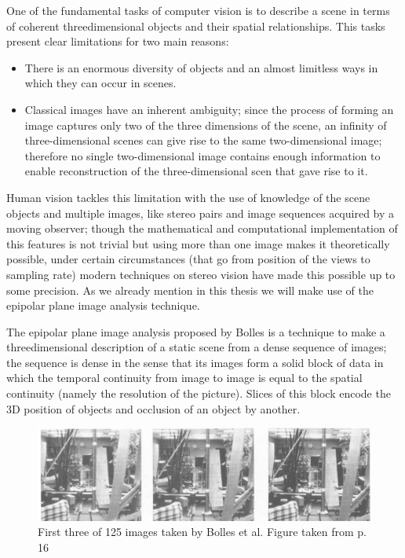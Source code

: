 One of the fundamental tasks of computer vision is to describe a scene in terms of coherent threedimensional objects and their spatial relationships. This tasks present clear limitations for two main reasons: 
\begin{itemize}
\item There is an enormous diversity of objects and an almost limitless ways in which they can occur in scenes.
\item Classical images have an inherent ambiguity; since the process of forming an image captures only two of the three dimensions of the scene, an infinity of three-dimensional scenes can give rise to the same two-dimensional image; therefore no single two-dimensional image contains enough information to enable reconstruction of the three-dimensional scen that gave rise to it.
\end{itemize}

Human vision tackles this limitation with the use of knowledge of the scene objects and multiple images, like stereo pairs and image sequences acquired by a moving observer; though the mathematical and computational implementation  of this features is not trivial but using more than one image makes it theoretically possible, under certain circumstances (that go from position of the views to sampling rate) modern techniques on stereo vision have made this possible up to some precision. As we already mention in this thesis we will make use of the epipolar plane image analysis technique.

\bigskip

The epipolar plane image analysis proposed by Bolles \cite{Bolles} is a technique to make a threedimensional description of a static scene from a dense sequence of images; the sequence is dense in the sense that its images form a solid block of data in which the temporal continuity from image to image is equal to the spatial continuity (namely the resolution of the picture). Slices of this block encode the 3D position of objects and occlusion of an object by another.

\begin{figure}[h!]
\centering
\includegraphics[width= 1\textwidth]{./Diagrams/multi-views1.jpg}
\caption{First three of 125 images taken by Bolles et al. Figure taken from \cite{Bolles} p. 16}
\label{fig:Bollesmultiviews}
\end{figure}

